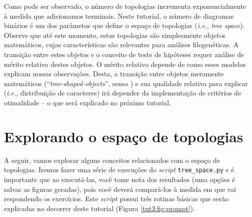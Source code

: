\begin{refsection}
\begin{center}
\begin{longtable}{lcccccc}
\end{longtable}
\end{center}



	Como pode ser observado, o número de topologias incrementa exponencialmente à medida que adicionamos terminais. Neste tutorial, o número de diagramas binários é um dos parâmetos que define o espaço de topologias (\textit{i.e.}, \textit{tree space}). Observe que até este momento, estas topologias são simplesmente objetos matemáticos, cujas características são relevantes para análises filogenéticas. A transição entre estes objetos e o conceito de teste de hipóteses requer análise de mérito relativo destes objetos. O mérito relativo depende de como esses modelos explicam nossas observações. Desta, a transição entre objetos meramente matemáticos (``\textit{tree-shaped-objects}'', senso \cite{Wheeler_2012}) e sua qualidade relativa para explicar (\textit{i.e.}, distribuição de caracteres) irá depender da implementação de critérios de otimalidade -- o que será explicado no próximo tutorial.


\section{Explorando o espaço de topologias}\label{tut3:tree_space_expĺore}

	A seguir, vamos explorar alguns conceitos relacionados com o espaço de topologias. Iremos fazer uma série de execuções do \textit{script} \texttt{tree\_space.py} e é importante que ao executá-las, você tome nota dos resultados (uma opções é salvas as figuras geradas), pois você deverá compará-los à medida em que vai respondendo os exercícios. Este \textit{script} possui três rotinas básicas que serão explicadas no decorrer deste tutorial (Figura \ref{tut3:fig:prompt}).


\end{refsection}

